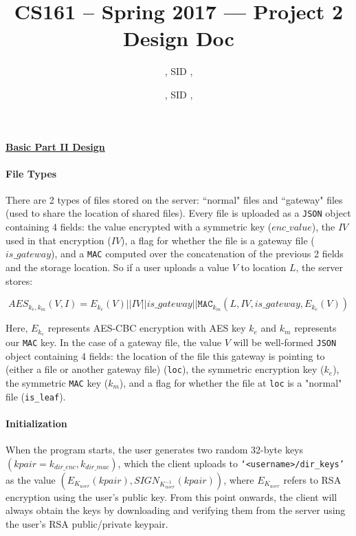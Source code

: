 \documentclass[12pt]{exam}
\title{CS161 -- Spring 2017 --- Project 2 Design Doc}
\author{
\Name, SID \SID, \texttt{\Login}
\and
\SecondName, SID \SecondSID, \texttt{\SecondLogin}
}
\date{}
\begin{document}
\maketitle

\large
\begin{center} \underline{\textbf{Basic Part II Design}} \end{center}

\normalsize
\paragraph{File Types}
There are 2 types of files stored on the server: ``normal" files and ``gateway" files (used to share the location of shared files). Every file is uploaded as a \texttt{JSON} object containing 4 fields: the value encrypted with a symmetric key ($enc\_value $), the $IV$ used in that encryption ($IV$), a flag for whether the file is a gateway file ($is\_gateway$), and a \texttt{MAC} computed over the concatenation of the previous 2 fields and the storage location. So if a user uploads a value $V$ to location $L$, the server stores:

\[AES_{k_e,k_m}(V, I) = E_{k_e}(V) || IV || is\_gateway|| \texttt{MAC}_{k_m}(L, IV, is\_gateway, E_{k_e}(V))\]

Here,  $E_{k_e}$ represents AES-CBC encryption with AES key $k_e$ and $k_m$ represents our \texttt{MAC} key. In the case of a gateway file, the value $V$ will be well-formed \texttt{JSON} object containing 4 fields: the location of the file this gateway is pointing to (either a file or another gateway file) (\texttt{loc}), the symmetric encryption key (\texttt{$k_e$}), the symmetric \texttt{MAC} key (\texttt{$k_m$}), and a flag for whether the file at \texttt{loc} is a "normal" file (\texttt{is\_leaf}).

\paragraph{Initialization}
When the program starts, the user generates two random 32-byte keys $(kpair = k_{dir\_enc}, k_{dir\_mac})$, which the client uploads to \texttt{`\textless username\textgreater/dir\_keys'} as the value $(E_{K_{user}}(kpair), SIGN_{K_{user}^{-1}}(kpair))$, where $E_{K_{user}}$ refers to RSA encryption using the user's public key. From this point onwards, the client will always obtain the keys by downloading and verifying them from the server using the user's RSA public/private keypair.
\end{document}
